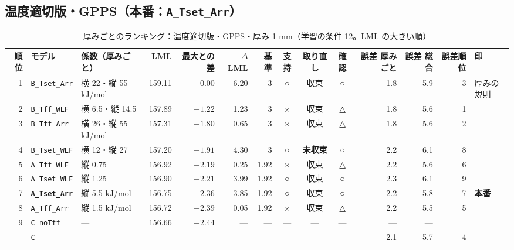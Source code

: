 \documentclass[paper=a4paper,landscape,fontsize=10pt,line_length=62zw,number_of_lines=34]{jlreq}
\let\origtextbf\textbf
\renewcommand{\textbf}[1]{\origtextbf{\gtfamily #1}}   %
\begin{document}
\subsection{温度適切版・GPPS（本番：\texttt{A\_\allowbreak{}Tset\_\allowbreak{}Arr}）}
\begin{table}[H]\centering\footnotesize
\caption{厚みごとのランキング：温度適切版・GPPS・厚み 1 mm（学習の条件 12。LML の大きい順）}
\begin{tabular}{rlp{11\zw}rrrrccc rrrl}
\toprule
順位 & モデル & 係数（厚みごと） & LML & 最大との差 & $\Delta$LML & 基準 & 支持 & 取り直し & 確認 & 誤差 厚みごと & 誤差 総合 & 誤差順位 & 印 \\
\midrule
1 & \texttt{B\_\allowbreak{}Tset\_\allowbreak{}Arr} & 横 22・縦 55 kJ/mol & 159.11 & 0.00 & 6.20 & 3 & ○ & 収束 & ○ & 1.8 & 5.9 & 3 & 厚みの規則 \\
2 & \texttt{B\_\allowbreak{}Tff\_\allowbreak{}WLF} & 横 6.5・縦 14.5 & 157.89 & $-1.22$ & 1.23 & 3 & × & 収束 & △ & 1.8 & 5.6 & 1 &  \\
3 & \texttt{B\_\allowbreak{}Tff\_\allowbreak{}Arr} & 横 26・縦 55 kJ/mol & 157.31 & $-1.80$ & 0.65 & 3 & × & 収束 & △ & 1.8 & 5.6 & 2 &  \\
4 & \texttt{B\_\allowbreak{}Tset\_\allowbreak{}WLF} & 横 12・縦 27 & 157.20 & $-1.91$ & 4.30 & 3 & ○ & \textbf{未収束} & ○ & 2.2 & 6.1 & 8 &  \\
5 & \texttt{A\_\allowbreak{}Tff\_\allowbreak{}WLF} & 縦 0.75 & 156.92 & $-2.19$ & 0.25 & 1.92 & × & 収束 & △ & 2.2 & 5.6 & 6 &  \\
6 & \texttt{A\_\allowbreak{}Tset\_\allowbreak{}WLF} & 縦 1.25 & 156.90 & $-2.21$ & 3.99 & 1.92 & ○ & 収束 & ○ & 2.3 & 6.1 & 9 &  \\
7 & \textbf{\texttt{A\_\allowbreak{}Tset\_\allowbreak{}Arr}} & 縦 5.5 kJ/mol & 156.75 & $-2.36$ & 3.85 & 1.92 & ○ & 収束 & ○ & 2.2 & 5.8 & 7 & \textbf{本番} \\
8 & \texttt{A\_\allowbreak{}Tff\_\allowbreak{}Arr} & 縦 1.5 kJ/mol & 156.72 & $-2.39$ & 0.05 & 1.92 & × & 収束 & △ & 2.2 & 5.5 & 5 &  \\
9 & \texttt{C\_\allowbreak{}noTff} & --- & 156.66 & $-2.44$ & --- & --- & --- & --- & --- & --- & --- &  &  \\
 & \texttt{C} & --- & --- & --- & --- & --- & --- & --- & --- & 2.1 & 5.7 & 4 &  \\
\bottomrule
\end{tabular}
\end{table}
\end{document}
